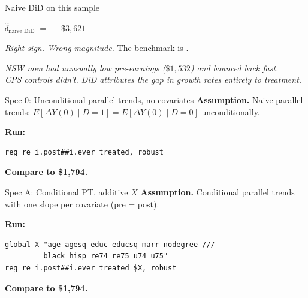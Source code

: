 \documentclass[11pt,aspectratio=169]{beamer}
\begin{document}
\begin{frame}{Naive DiD on this sample}
\vspace{1.2em}
\begin{center}
\Large
$\widehat{\delta}_{\text{naive DiD}} \;=\; +\$3{,}621$
\end{center}
\vspace{0.6em}
\begin{center}
\large
\textit{Right sign. \;Wrong magnitude.} \;The benchmark is \;.
\end{center}
\vspace{0.8em}
\begin{center}
\small\color{warmgray}\itshape
NSW men had unusually low pre-earnings ($\$1{,}532$) and bounced back fast. \\
CPS controls didn't. \;DiD attributes the gap in growth rates entirely to treatment.
\end{center}
\end{frame}


\begin{frame}[fragile]{Spec 0: Unconditional parallel trends, no covariates}
\textbf{Assumption.} \;Naive parallel trends: $E[\Delta Y(0) \mid D{=}1] = E[\Delta Y(0) \mid D{=}0]$ unconditionally.
\vspace{0.6em}

\textbf{Run:}
\begin{lstlisting}[language={[ANSI]C},basicstyle=\ttfamily\small]
reg re i.post##i.ever_treated, robust
\end{lstlisting}

\vspace{0.4em}
\textbf{Compare to \$1,794.}
\end{frame}

\begin{frame}[fragile]{Spec A: Conditional PT, additive $X$}
\textbf{Assumption.} \;Conditional parallel trends with one slope per covariate (pre = post).
\vspace{0.6em}

\textbf{Run:}
\begin{lstlisting}[language={[ANSI]C},basicstyle=\ttfamily\scriptsize]
global X "age agesq educ educsq marr nodegree ///
         black hisp re74 re75 u74 u75"
reg re i.post##i.ever_treated $X, robust
\end{lstlisting}

\vspace{0.4em}
\textbf{Compare to \$1,794.}
\end{frame}
\end{document}
